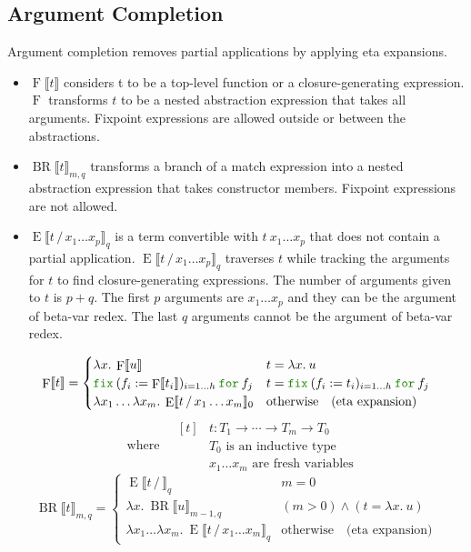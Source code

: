 \documentclass[a4paper,fleqn]{article}
\newcommand{\kwfix}{\mbox{\color{mygreen}\ttfamily fix}}
\newcommand{\kwfor}{\mbox{\color{mygreen}\ttfamily for}}
\newcommand{\lam}[2]{\lambda #1.\:#2}
\newcommand{\lamB}[1]{\lambda #1.\:}
\newcommand{\fix}[4]{\kwfix\:(#1 := #2)_{#3}\:\kwfor\:#4}
\newcommand{\BRA}[1]{\llbracket #1 \rrbracket}
\DeclareMathOperator{\Fop}{F}
\newcommand{\F}[1]{\Fop\BRA{#1}}
\DeclareMathOperator{\BRop}{BR}
\newcommand{\BR}[3]{\BRop\BRA{#1}_{#2,#3}}
\DeclareMathOperator{\Eop}{E}
\newcommand{\E}[3]{\Eop\BRA{#1\,/\,#2}_{#3}}
\begin{document}
\subsection{Argument Completion}\label{sec:argcomp}
Argument completion removes partial applications by applying eta expansions.
\begin{itemize}
  \item $\F{t}$ considers t to be a top-level function or a closure-generating expression.  $\Fop$ transforms $t$ to be a nested abstraction expression that takes all arguments.
    Fixpoint expressions are allowed outside or between the abstractions.
  \item $\BR{t}{m}{q}$ transforms a branch of a match expression into a nested abstraction expression that takes constructor members.
    Fixpoint expressions are not allowed.
  \item $\E{t}{x_1\ldots x_p}{q}$ is a term convertible with $t\:x_1\ldots x_p$ that does not contain a partial application.
    $\E{t}{x_1\ldots x_p}{q}$ traverses $t$ while tracking the arguments for $t$ to find closure-generating expressions.
    The number of arguments given to $t$ is $p+q$.
    The first $p$ arguments are $x_1\ldots x_p$ and they can be the argument of beta-var redex.
    The last $q$ arguments cannot be the argument of beta-var redex.
\end{itemize}
\[
  \F{t} =
  \begin{cases}
    \lam{x}{\F{u}} & t = \lam{x}{u} \\
    \fix{f_i}{\F{t_i}}{i=1\ldots h}{f_j}  & t = \fix{f_i}{t_i}{i=1\ldots h}{f_j} \\
    \lambda x_1\ldots\lamB{x_m}\E{t}{x_1\ldots x_m}{0}        & \text{otherwise} \quad \text{(eta expansion)}
  \end{cases}
\]
\[ \quad\text{where} \quad
  \begin{aligned}[t]
    & t : T_1 \rightarrow \dotsb \rightarrow T_m \rightarrow T_0 \\
    & \text{$T_0$ is an inductive type} \\
    & \text{$x_1\ldots x_m$ are fresh variables}
  \end{aligned}
\]
\[
  \BR{t}{m}{q} =
  \begin{cases}
    \E{t}{}{q}    & m = 0 \\
    \lam{x}{\BR{u}{m-1}{q}} & (m > 0) \wedge (t = \lam{x}{u}) \\
    \lambda x_1\ldots\lamB{x_m}\E{t}{x_1\ldots x_m}{q}        & \text{otherwise} \quad \text{(eta expansion)}
  \end{cases}
\]
\end{document}
